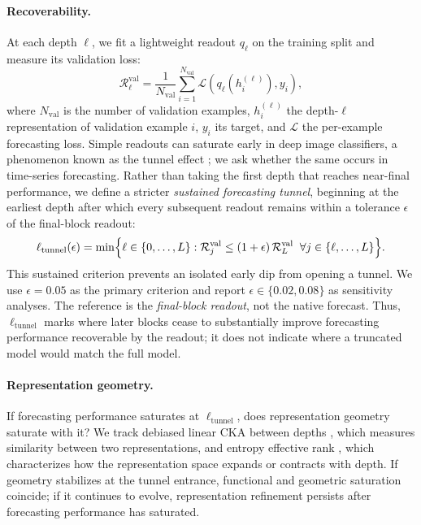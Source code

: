 \documentclass{article} %
\begin{document}
\paragraph{Recoverability.}
At each depth $\ell$, we fit a lightweight readout $q_\ell$ on the training split and measure its validation loss:
\begin{equation}
\mathcal{R}_{\ell}^{\mathrm{val}}
= \frac{1}{N_{\mathrm{val}}} \sum_{i=1}^{N_{\mathrm{val}}}
\mathcal{L}\!\left(q_{\ell}\!\left(h_i^{(\ell)}\right), y_i\right),
\label{eq:layerwise_risk}
\end{equation}
where $N_{\mathrm{val}}$ is the number of validation examples, $h_i^{(\ell)}$ the depth-$\ell$ representation of validation example $i$, $y_i$ its target, and $\mathcal{L}$ the per-example forecasting loss. Simple readouts can saturate early in deep image classifiers, a phenomenon known as the tunnel effect \citep{masarczyk2023tunneleffectbuildingdata}; we ask whether the same occurs in time-series forecasting. Rather than taking the first depth that reaches near-final performance, we define a stricter \emph{sustained forecasting tunnel}, beginning at the earliest depth after which every subsequent readout remains within a tolerance $\epsilon$ of the final-block readout:
\begin{equation}
\ell_{\mathrm{tunnel}}(\epsilon)
= \min\Bigl\{ \ell \in \{0,\dots,L\} :
\mathcal{R}_{j}^{\mathrm{val}} \le (1+\epsilon)\,\mathcal{R}_{L}^{\mathrm{val}}
\;\;\forall j \in \{\ell,\dots,L\} \Bigr\}.
\label{eq:tunnel_entrance}
\end{equation}
This sustained criterion prevents an isolated early dip from opening a tunnel. We use $\epsilon=0.05$ as the primary criterion and report $\epsilon\in\{0.02,0.08\}$ as sensitivity analyses. The reference is the \emph{final-block readout}, not the native forecast. Thus, $\ell_{\mathrm{tunnel}}$ marks where later blocks cease to substantially improve forecasting performance recoverable by the readout; it does not indicate where a truncated model would match the full model.

\paragraph{Representation geometry.}
If forecasting performance saturates at $\ell_{\mathrm{tunnel}}$, does representation geometry saturate with it? We track debiased linear CKA between depths \citep{JMLR:v13:song12a,kornblith2019similarityneuralnetworkrepresentations,murphy2024correctingbiasedcenteredkernel,cortes2024algorithmslearningkernelsbased}, which measures similarity between two representations, and entropy effective rank \citep{7098875}, which characterizes how the representation space expands or contracts with depth. If geometry stabilizes at the tunnel entrance, functional and geometric saturation coincide; if it continues to evolve, representation refinement persists after forecasting performance has saturated.
\end{document}
